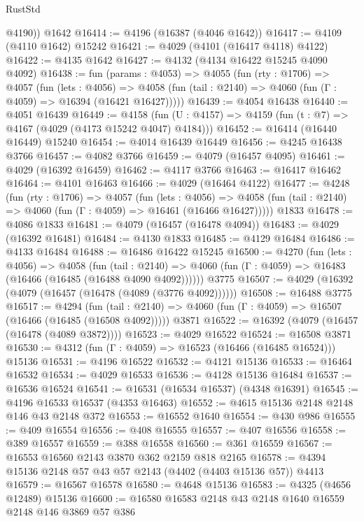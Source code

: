 \begin{lexlean}{RustStd}
\begin{coremodule}
        @4190))
    @1642
@16414 := @4196 (@16387 (@4046 @1642))
@16417 := @4109 (@4110 @1642) @15242
@16421 := @4029 (@4101 (@16417 @4118) @4122)
@16422 := @4135 @1642
@16427 := @4132 (@4134 @16422 @15245 @4090 @4092)
@16438 := fun (params : @4053) =>
  @4055
    (fun (rty : @1706) =>
    @4057
      (fun (lets : @4056) =>
      @4058 (fun (tail : @2140) => @4060 (fun (Γ : @4059) => @16394 (@16421 @16427)))))
@16439 := @4054 @16438
@16440 := @4051 @16439
@16449 := @4158
    (fun (U : @4157) => @4159 (fun (t : @7) => @4167 (@4029 (@4173 @15242 @4047) @4184)))
@16452 := @16414 (@16440 @16449) @15240
@16454 := @4014 @16439 @16449
@16456 := @4245 @16438 @3766
@16457 := @4082 @3766
@16459 := @4079 (@16457 @4095)
@16461 := @4029 (@16392 @16459)
@16462 := @4117 @3766
@16463 := @16417 @16462
@16464 := @4101 @16463
@16466 := @4029 (@16464 @4122)
@16477 := @4248
    (fun (rty : @1706) =>
    @4057
      (fun (lets : @4056) =>
      @4058 (fun (tail : @2140) => @4060 (fun (Γ : @4059) => @16461 (@16466 @16427)))))
    @1833
@16478 := @4086 @1833
@16481 := @4079 (@16457 (@16478 @4094))
@16483 := @4029 (@16392 @16481)
@16484 := @4130 @1833
@16485 := @4129 @16484
@16486 := @4133 @16484
@16488 := @16486 @16422 @15245
@16500 := @4270
    (fun (lets : @4056) =>
    @4058
      (fun (tail : @2140) =>
      @4060 (fun (Γ : @4059) => @16483 (@16466 (@16485 (@16488 @4090 @4092))))))
    @3775
@16507 := @4029 (@16392 (@4079 (@16457 (@16478 (@4089 (@3776 @4092))))))
@16508 := @16488 @3775
@16517 := @4294
    (fun (tail : @2140) => @4060 (fun (Γ : @4059) => @16507 (@16466 (@16485 (@16508 @4092)))))
    @3871
@16522 := @16392 (@4079 (@16457 (@16478 (@4089 @3872))))
@16523 := @4029 @16522
@16524 := @16508 @3871
@16530 := @4312 (fun (Γ : @4059) => @16523 (@16466 (@16485 @16524))) @15136
@16531 := @4196 @16522
@16532 := @4121 @15136
@16533 := @16464 @16532
@16534 := @4029 @16533
@16536 := @4128 @15136 @16484
@16537 := @16536 @16524
@16541 := @16531 (@16534 @16537) (@4348 @16391)
@16545 := @4196 @16533 @16537 (@4353 @16463)
@16552 := @4615 @15136 @2148 @2148 @146 @43 @2148 @372
@16553 := @16552 @1640
@16554 := @430 @986
@16555 := @409 @16554
@16556 := @408 @16555
@16557 := @407 @16556
@16558 := @389 @16557
@16559 := @388 @16558
@16560 := @361 @16559
@16567 := @16553 @16560 @2143 @3870 @362 @2159 @818 @2165
@16578 := @4394 @15136 @2148 @57 @43 @57 @2143 (@4402 (@4403 @15136 @57)) @4413
@16579 := @16567 @16578
@16580 := @4648 @15136
@16583 := @4325 (@4656 @12489) @15136
@16600 := @16580
    @16583
    @2148
    @43
    @2148
    @1640
    @16559
    @2148
    @146
    @3869
    @57
    @386

\end{coremodule}
\end{lexlean}
